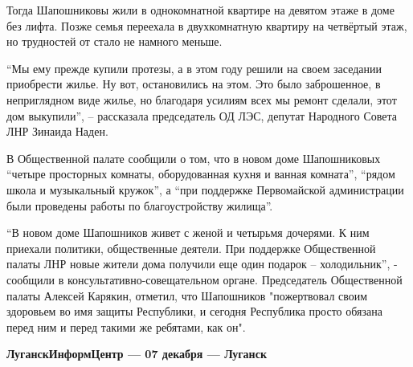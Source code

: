 Тогда Шапошниковы жили в однокомнатной квартире на девятом этаже в доме без
лифта. Позже семья переехала в двухкомнатную квартиру на четвёртый этаж, но
трудностей от стало не намного меньше.

\enquote{Мы ему прежде купили протезы, а в этом году решили на своем заседании приобрести жилье. Ну вот, остановились на этом. Это было заброшенное, в неприглядном виде жилье, но благодаря усилиям всех мы ремонт сделали, этот дом выкупили}, – рассказала председатель ОД ЛЭС, депутат Народного Совета ЛНР Зинаида Наден.

В Общественной палате сообщили о том, что в новом доме Шапошниковых \enquote{четыре
просторных комнаты, оборудованная кухня и ванная комната}, \enquote{рядом школа и
музыкальный кружок}, а \enquote{при поддержке Первомайской администрации были проведены
работы по благоустройству жилища}.

\enquote{В новом доме Шапошников живет с женой и четырьмя дочерями. К ним приехали
политики, общественные деятели. При поддержке Общественной палаты ЛНР новые
жители дома получили еще один подарок – холодильник}, - сообщили в
консультативно-совещательном органе.
Председатель Общественной палаты Алексей Карякин, отметил, что Шапошников "пожертвовал своим здоровьем во имя защиты Республики, и сегодня Республика просто обязана перед ним и перед такими же ребятами, как он".

\textbf{ЛуганскИнформЦентр — 07 декабря — Луганск}

